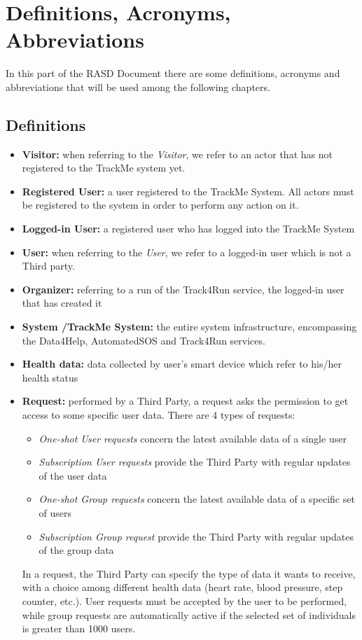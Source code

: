 \section{Definitions, Acronyms, Abbreviations}
In this part of the RASD Document there are some definitions, acronyms and abbreviations that will be used among the following chapters.
\subsection{Definitions}

\begin{itemize}

\item \textbf{Visitor:} when referring to the \emph{Visitor}, we refer to an actor that has not registered to the TrackMe system yet.

\item \textbf{Registered User:} a user registered to the TrackMe System. All actors must be registered to the system in order to perform any action on it.

\item\textbf{Logged-in User:} a registered user who has logged into the TrackMe System

\item \textbf{User:} when referring to the \emph{User}, we refer to a logged-in user which is not a Third party. 

\item\textbf{Organizer:} referring to a run of the Track4Run service, the logged-in user that has created it

\item \textbf{System /TrackMe System:} the entire system infrastructure, encompassing the Data4Help, AutomatedSOS and Track4Run services.

\item\textbf{Health data:} data collected by user's smart device which refer to his/her health status

\item\textbf{Request:} performed by a Third Party, a request asks the permission to get access to some specific user data.
There are 4 types of requests: 
\begin{itemize}
\item \textit{One-shot User requests} concern the latest available data of a single user
\item \textit{Subscription User requests} provide the Third Party with regular updates of the user data
\item \textit{One-shot Group requests} concern the latest available data of a specific set of users
\item \textit{Subscription Group request} provide the Third Party with regular updates of the group data
\end{itemize}
In a request, the Third Party can specify the type of data it wants to receive, with a choice among different health data (heart rate, blood pressure, step counter, etc.). User requests must be accepted by the user to be performed, while group requests are automatically active if the selected set of individuals is greater than 1000 users.


\end{itemize}
